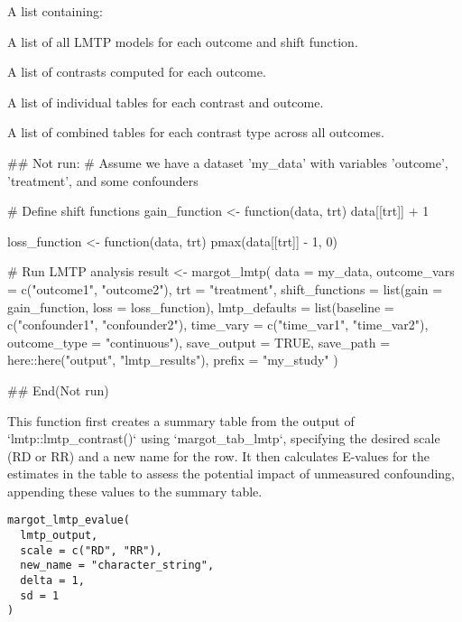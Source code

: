 \documentclass[a4paper]{book}
\begin{document}
%
\begin{Value}
A list containing:
\begin{ldescription}
\item[\code{models}] A list of all LMTP models for each outcome and shift function.
\item[\code{contrasts}] A list of contrasts computed for each outcome.
\item[\code{individual\_tables}] A list of individual tables for each contrast and outcome.
\item[\code{combined\_tables}] A list of combined tables for each contrast type across all outcomes.
\end{ldescription}
\end{Value}
%
\begin{Examples}
\begin{ExampleCode}
## Not run: 
# Assume we have a dataset 'my_data' with variables 'outcome', 'treatment', and some confounders

# Define shift functions
gain_function <- function(data, trt) {
  data[[trt]] + 1
}

loss_function <- function(data, trt) {
  pmax(data[[trt]] - 1, 0)
}

# Run LMTP analysis
result <- margot_lmtp(
  data = my_data,
  outcome_vars = c("outcome1", "outcome2"),
  trt = "treatment",
  shift_functions = list(gain = gain_function, loss = loss_function),
  lmtp_defaults = list(baseline = c("confounder1", "confounder2"),
                       time_vary = c("time_var1", "time_var2"),
                       outcome_type = "continuous"),
  save_output = TRUE,
  save_path = here::here("output", "lmtp_results"),
  prefix = "my_study"
)

## End(Not run)

\end{ExampleCode}
\end{Examples}
%
\begin{Description}
This function first creates a summary table from the output of `lmtp::lmtp\_contrast()` using
`margot\_tab\_lmtp`, specifying the desired scale (RD or RR) and a new name for the row. It then calculates
E-values for the estimates in the table to assess the potential impact of unmeasured confounding,
appending these values to the summary table.
\end{Description}
%
\begin{Usage}
\begin{verbatim}
margot_lmtp_evalue(
  lmtp_output,
  scale = c("RD", "RR"),
  new_name = "character_string",
  delta = 1,
  sd = 1
)
\end{verbatim}
\end{Usage}
\end{document}
